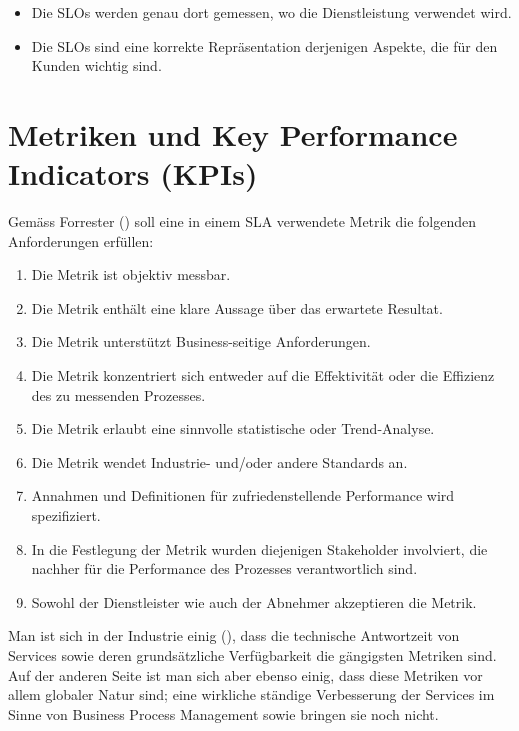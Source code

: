 \documentclass[11pt,listof=totoc]{scrreprt} %
\theoremstyle{definition}
\begin{document}
\begin{itemize}
\item Die SLOs werden genau dort gemessen, wo die Dienstleistung verwendet wird.
\item Die SLOs sind eine korrekte Repräsentation derjenigen Aspekte, die für den Kunden wichtig sind.
\end{itemize}

\section{Metriken und Key Performance Indicators (KPIs)}

Gemäss Forrester (\cite{forrester:slaBestPractices}) soll eine in einem SLA verwendete Metrik die folgenden Anforderungen erfüllen:

\begin{enumerate}
\item Die Metrik ist objektiv messbar.
\item Die Metrik enthält eine klare Aussage über das erwartete Resultat.
\item Die Metrik unterstützt Business-seitige Anforderungen.
\item Die Metrik konzentriert sich entweder auf die Effektivität oder die Effizienz des zu messenden Prozesses.
\item Die Metrik erlaubt eine sinnvolle statistische oder Trend-Analyse.
\item Die Metrik wendet Industrie- und/oder andere Standards an.
\item Annahmen und Definitionen für zufriedenstellende Performance wird spezifiziert.
\item In die Festlegung der Metrik wurden diejenigen Stakeholder involviert, die nachher für die Performance des Prozesses verantwortlich sind.
\item Sowohl der Dienstleister wie auch der Abnehmer akzeptieren die Metrik.
\end{enumerate}

Man ist sich in der Industrie einig (\cite{forrester:slaBestPractices, EllisKauferstein200311}), dass die technische Antwortzeit von Services sowie deren grundsätzliche Verfügbarkeit die gängigsten Metriken sind. Auf der anderen Seite ist man sich aber ebenso einig, dass diese Metriken vor allem globaler Natur sind; eine wirkliche ständige Verbesserung der Services im Sinne von Business Process Management sowie \cite{EllisKauferstein200311} bringen sie noch nicht.
\end{document}
